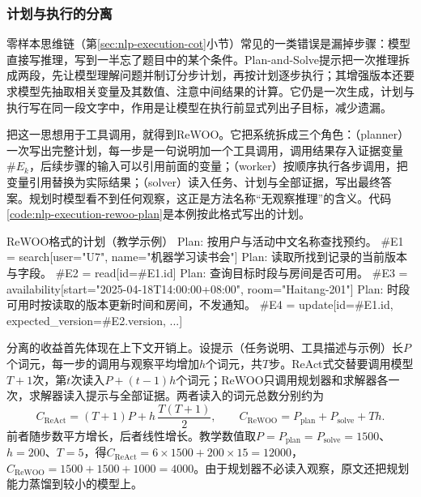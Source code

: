 \subsubsection{计划与执行的分离}
\label{sec:nlp-execution-plan-execute}

零样本思维链（第\ref{sec:nlp-execution-cot}小节）常见的一类错误是漏掉步骤：模型直接写推理，写到一半忘了题目中的某个条件。Plan-and-Solve提示把一次推理拆成两段，先让模型理解问题并制订分步计划，再按计划逐步执行；其增强版本还要求模型先抽取相关变量及其数值、注意中间结果的计算。它仍是一次生成，计划与执行写在同一段文字中，作用是让模型在执行前显式列出子目标，减少遗漏。

把这一思想用于工具调用，就得到ReWOO。它把系统拆成三个角色：（planner）一次写出完整计划，每一步是一句说明加一个工具调用，调用结果存入证据变量$\#E_k$，后续步骤的输入可以引用前面的变量；（worker）按顺序执行各步调用，把变量引用替换为实际结果；（solver）读入任务、计划与全部证据，写出最终答案。规划时模型看不到任何观察，这正是方法名称“无观察推理”的含义。代码\ref{code:nlp-execution-rewoo-plan}是本例按此格式写出的计划。

\begin{codeblock}[label={code:nlp-execution-rewoo-plan}]{ReWOO格式的计划（教学示例）}
Plan: 按用户与活动中文名称查找预约。
#E1 = search[user="U7", name="机器学习读书会"]
Plan: 读取所找到记录的当前版本与字段。
#E2 = read[id=#E1.id]
Plan: 查询目标时段与房间是否可用。
#E3 = availability[start="2025-04-18T14:00:00+08:00", room="Haitang-201"]
Plan: 时段可用时按读取的版本更新时间和房间，不发通知。
#E4 = update[id=#E1.id, expected_version=#E2.version, ...]
\end{codeblock}

分离的收益首先体现在上下文开销上。设提示（任务说明、工具描述与示例）长$P$个词元，每一步的调用与观察平均增加$h$个词元，共$T$步。ReAct式交替要调用模型$T+1$次，第$t$次读入$P+(t-1)h$个词元；ReWOO只调用规划器和求解器各一次，求解器读入提示与全部证据。两者读入的词元总数分别约为
\begin{equation}
 C_{\mathrm{ReAct}}=(T+1)P+h\,\frac{T(T+1)}{2},\qquad
 C_{\mathrm{ReWOO}}=P_{\mathrm{plan}}+P_{\mathrm{solve}}+Th .
 \label{eq:nlp-execution-token-cost}
\end{equation}
前者随步数平方增长，后者线性增长。教学数值取$P=P_{\mathrm{plan}}=P_{\mathrm{solve}}=1500$、$h=200$、$T=5$，得$C_{\mathrm{ReAct}}=6\times1500+200\times15=12000$，$C_{\mathrm{ReWOO}}=1500+1500+1000=4000$。由于规划器不必读入观察，原文还把规划能力蒸馏到较小的模型上。

